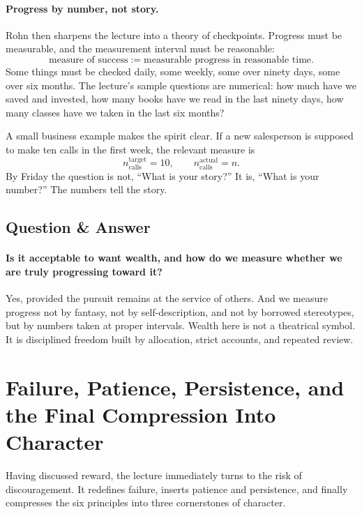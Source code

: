 \paragraph{Progress by number, not story.}
Rohn then sharpens the lecture into a theory of checkpoints. Progress must be measurable, and the measurement interval must be reasonable:
\begin{equation}
\text{measure of success} := \text{measurable progress in reasonable time}.
\end{equation}
Some things must be checked daily, some weekly, some over ninety days, some over six months. The lecture's sample questions are numerical: how much have we saved and invested, how many books have we read in the last ninety days, how many classes have we taken in the last six months?

A small business example makes the spirit clear. If a new salesperson is supposed to make ten calls in the first week, the relevant measure is
\begin{equation}
n_{\text{calls}}^{\text{target}} = 10, \qquad
n_{\text{calls}}^{\text{actual}} = n.
\end{equation}
By Friday the question is not, ``What is your story?'' It is, ``What is your number?'' The numbers tell the story.

\subsection{Question \& Answer}

\paragraph{Is it acceptable to want wealth, and how do we measure whether we are truly progressing toward it?}
Yes, provided the pursuit remains at the service of others. And we measure progress not by fantasy, not by self-description, and not by borrowed stereotypes, but by numbers taken at proper intervals. Wealth here is not a theatrical symbol. It is disciplined freedom built by allocation, strict accounts, and repeated review.

\section{Failure, Patience, Persistence, and the Final Compression Into Character}

Having discussed reward, the lecture immediately turns to the risk of discouragement. It redefines failure, inserts patience and persistence, and finally compresses the six principles into three cornerstones of character.

